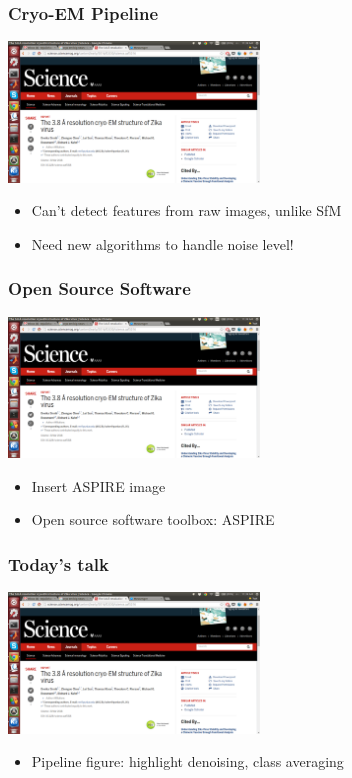 \documentclass{beamer}
\begin{document}
\begin{frame}
\frametitle{Cryo-EM Pipeline}
\includegraphics[width=0.5\textwidth]{zika.png}%
\begin{itemize}
  \item Can't detect features from raw images, unlike SfM
 \item Need new algorithms to handle noise level!
\end{itemize}
\end{frame}

\begin{frame}
\frametitle{Open Source Software}
\includegraphics[width=0.5\textwidth]{zika.png}%
\begin{itemize}
  \item Insert ASPIRE image
  \item Open source software toolbox: ASPIRE
\end{itemize}
\end{frame}


\begin{frame}
\frametitle{Today's talk}
\includegraphics[width=0.5\textwidth]{zika.png}%
\begin{itemize}
  \item Pipeline figure: highlight denoising, class averaging
\end{itemize}
\end{frame}
\end{document}
